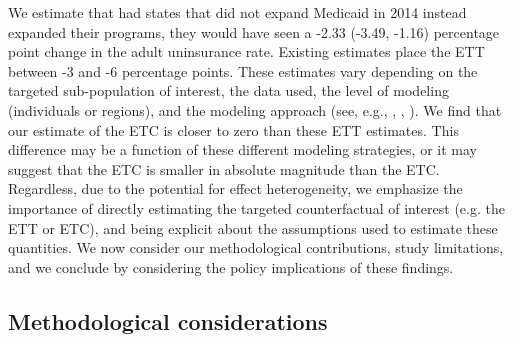 We estimate that had states that did not expand Medicaid in 2014 instead expanded their programs, they would have seen a -2.33 (-3.49, -1.16) percentage point change in the adult uninsurance rate. Existing estimates place the ETT between -3 and -6 percentage points. These estimates vary depending on the targeted sub-population of interest, the data used, the level of modeling (individuals or regions), and the modeling approach (see, e.g., \cite{courtemanche2017early}, \cite{kaestner2017effects}, \cite{frean2017premium}). We find that our estimate of the ETC is closer to zero than these ETT estimates. This difference may be a function of these different modeling strategies, or it may suggest that the ETC is smaller in absolute magnitude than the ETC. Regardless, due to the potential for effect heterogeneity, we emphasize the importance of directly estimating the targeted counterfactual of interest (e.g. the ETT or ETC), and being explicit about the assumptions used to estimate these quantities. We now consider our methodological contributions, study limitations, and we conclude by considering the policy implications of these findings.

\subsection{Methodological considerations}

